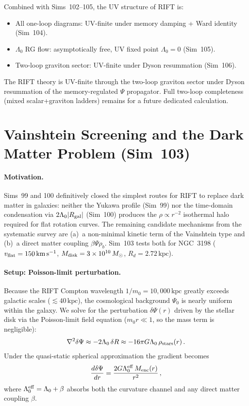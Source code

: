\documentclass[12pt,a4paper]{article}
\begin{document}
Combined with Sims~102--105, the UV structure of RIFT is:
\begin{itemize}
\item All one-loop diagrams: UV-finite under memory damping + Ward identity (Sim~104).
\item $\Lambda_0$ RG flow: asymptotically free, UV fixed point $\Lambda_0=0$ (Sim~105).
\item Two-loop graviton sector: UV-finite under Dyson resummation (Sim~106).
\end{itemize}
The RIFT theory is UV-finite through the two-loop graviton sector under
Dyson resummation of the memory-regulated $\Psi$ propagator.
Full two-loop completeness (mixed scalar+graviton ladders) remains for
a future dedicated calculation.

\section{Vainshtein Screening and the Dark Matter Problem (Sim~103)}
\label{sec:sim103}

\paragraph{Motivation.}
Sims~99 and 100 definitively closed the simplest routes for RIFT to replace dark
matter in galaxies: neither the Yukawa profile (Sim~99) nor the time-domain
condensation via $2\Lambda_0|R_{\rm gal}|$ (Sim~100) produces the $\rho\propto r^{-2}$
isothermal halo required for flat rotation curves.  The remaining candidate
mechanisms from the systematic survey are (a)~a non-minimal kinetic term of the
Vainshtein type and (b)~a direct matter coupling $\beta\Psi\rho_b$.
Sim~103 tests both for NGC~3198 ($v_{\rm flat} = 150\,\mathrm{km\,s^{-1}}$,
$M_{\rm disk} = 3\times 10^{10}\,M_\odot$, $R_d = 2.72\,\mathrm{kpc}$).

\paragraph{Setup: Poisson-limit perturbation.}
Because the RIFT Compton wavelength $1/m_0 = 10{,}000\,\mathrm{kpc}$ greatly exceeds
galactic scales ($\lesssim 40\,\mathrm{kpc}$), the cosmological background
$\Psi_0$ is nearly uniform within the galaxy.  We solve for the perturbation
$\delta\Psi(r)$ driven by the stellar disk via the Poisson-limit field equation
($m_0 r \ll 1$, so the mass term is negligible):
\begin{equation}
\nabla^2\delta\Psi \approx -2\Lambda_0\,\delta R \approx
  -16\pi G\Lambda_0\,\rho_{\rm stars}(r)\,.
\end{equation}
Under the quasi-static spherical approximation the gradient becomes
\begin{equation}
\frac{d\delta\Psi}{dr} = \frac{2G\Lambda_0^{\rm eff}\,M_{\rm enc}(r)}{r^2}\,,
\label{eq:dPsi_poisson}
\end{equation}
where $\Lambda_0^{\rm eff} = \Lambda_0 + \beta$ absorbs both the curvature channel
and any direct matter coupling $\beta$.
\end{document}
